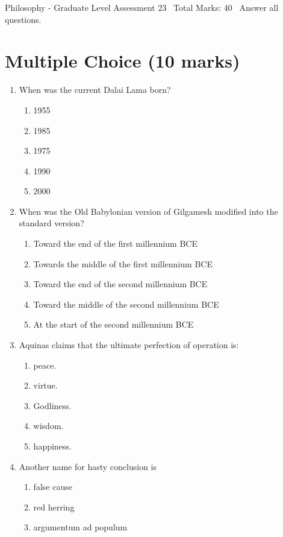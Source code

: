 \documentclass[12pt]{article}
\begin{document}
\begin{center}
Philosophy - Graduate Level Assessment 23 \
Total Marks: 40 \
Answer all questions.
\end{center}

\section*{Multiple Choice (10 marks)}
\begin{enumerate}[label=\arabic*.]
\item When was the current Dalai Lama born?
\begin{enumerate}[label=(\alph*)]
    \item 1955
    \item 1985
    \item 1975
    \item 1990
    \item 2000
\end{enumerate}
\item When was the Old Babylonian version of Gilgamesh modified into the standard version?
\begin{enumerate}[label=(\alph*)]
    \item Toward the end of the first millennium BCE
    \item Towards the middle of the first millennium BCE
    \item Toward the end of the second millennium BCE
    \item Toward the middle of the second millennium BCE
    \item At the start of the second millennium BCE
\end{enumerate}
\item Aquinas claims that the ultimate perfection of operation is:
\begin{enumerate}[label=(\alph*)]
    \item peace.
    \item virtue.
    \item Godliness.
    \item wisdom.
    \item happiness.
\end{enumerate}
\item Another name for hasty conclusion is
\begin{enumerate}[label=(\alph*)]
    \item false cause
    \item red herring
    \item argumentum ad populum

\end{enumerate}
\end{enumerate}
\end{document}
